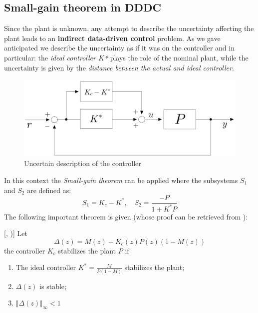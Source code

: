 \subsection{Small-gain theorem in DDDC}
Since the plant is unknown, any attempt to describe the uncertainty affecting the plant leads to an \textbf{indirect data-driven control} problem. As we gave anticipated we describe the uncertainty as if it was on the controller and in particular: the \textit{ideal controller $K$*} plays the role of the nominal plant, while the uncertainty is given by the \textit{distance between the actual and ideal controller}.

\begin{figure}
    \centering
    \includegraphics[scale=0.25]{img/SMT_DDDC.jpg}
    \caption{Uncertain description of the controller}
\end{figure}

\noindent
In this context the \textit{Small-gain theorem} can be applied where the subsystems $S_1$ and $S_2$ are defined as:
\begin{equation}
    S_1 = K_c-K^*, \quad S_2=\frac{-P}{1+K^*P}
\end{equation}
The following important theorem is given (whose proof can be retrieved from \cite{van2011data}):
\begin{theorem}\label{th:stab}[, \citeyear{van2011data})]
    Let
    \begin{equation}\label{eq:def_Delta}
        \Delta(z)=M(z)-K_c(z)P(z)(1-M(z))
    \end{equation}
    the controller $K_c$ stabilizes the plant $P$ if
    \begin{enumerate}
        \itemsep-0.2em
        \item The ideal controller $K^*=\frac{M}{P(1-M)}$ stabilizes the plant; 
        \item $\Delta(z)$ is stable;
        \item $\Vert \Delta(z) \Vert_\infty<1$
    \end{enumerate}
\end{theorem}

